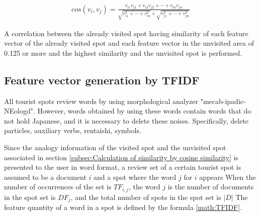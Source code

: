 \documentclass[journal]{IAENGtran}
\begin{document}
\begin{eqnarray}
cos(v_i,v_j)=\frac{v_{i1}v_{j1}+v_{i2}v_{j2}+\cdots+v_{in}v_{jn}}
{\sqrt{v^2_{i1}+\cdots+v^2_{in}}\times\sqrt{v^2_{j1}+\cdots+v^2_{jn}}}
\label{math:CosSim}
\end{eqnarray}

A correlation between the already visited spot having similarity of each feature vector of the already visited spot and each feature vector in the unvisited area of 0.125 or more and the highest similarity and the unvisited spot is performed.

\subsection{Feature vector generation by TFIDF}
\label{subsec:Feature vector generation by TFIDF}
All tourist spots review words by using morphological analyzer "mecab-ipadic-NEologd".
However, words obtained by using these words contain words that do not hold Japanese, and it is necessary to delete these noises.
Specifically, delete particles, auxiliary verbs, rentaishi, symbols.

Since the analogy information of the visited spot and the unvisited spot associated in section \ref{subsec:Calculation of similarity by cosine similarity} is presented to the user in word format, a review set of a certain tourist spot is assumed to be a document $i$ and a spot where the word $j$ for $i$ appears When the number of occurrences of the set is $TF_{i,j}$, the word $j$ is the number of documents in the spot set is $DF_{j}$, and the total number of spots in the spot set is $|D|$ The feature quantity of a word in a spot is defined by the formula \ref{math:TFIDF}.
\end{document}
